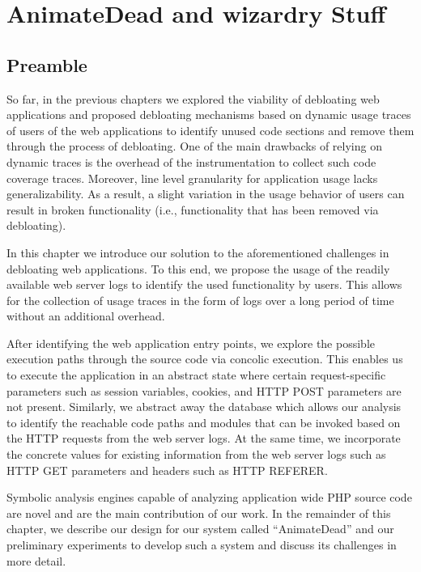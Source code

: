 \chapter{AnimateDead and wizardry Stuff}

\section*{Preamble}

So far, in the previous chapters we explored the viability of debloating web applications and proposed debloating mechanisms based on dynamic usage traces of users of the web applications to identify unused code sections and remove them through the process of debloating. 
One of the main drawbacks of relying on dynamic traces is the overhead of the instrumentation to collect such code coverage traces. 
Moreover, line level granularity for application usage lacks generalizability. 
As a result, a slight variation in the usage behavior of users can result in broken functionality (i.e., functionality that has been removed via debloating). 

In this chapter we introduce our solution to the aforementioned challenges in debloating web applications. 
To this end, we propose the usage of the readily available web server logs to identify the used functionality by users. 
This allows for the collection of usage traces in the form of logs over a long period of time without an additional overhead. 

After identifying the web application entry points, we explore the possible execution paths through the source code via concolic execution. 
This enables us to execute the application in an abstract state where certain request-specific parameters such as session variables, cookies, and HTTP POST parameters are not present. 
Similarly, we abstract away the database which allows our analysis to identify the reachable code paths and modules that can be invoked based on the HTTP requests from the web server logs. 
At the same time, we incorporate the concrete values for existing information from the web server logs such as HTTP GET parameters and headers such as HTTP REFERER. 

Symbolic analysis engines capable of analyzing application wide PHP source code are novel and are the main contribution of our work. 
In the remainder of this chapter, we describe our design for our system called ``AnimateDead'' and our preliminary experiments to develop such a system and discuss its challenges in more detail. 

